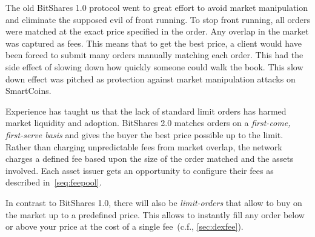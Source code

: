 The old BitShares 1.0 protocol went to great effort to avoid market
manipulation and eliminate the supposed evil of front running. To stop front
running, all orders were matched at the exact price specified in the order. Any
overlap in the market was captured as fees. This means that to get the best
price, a client would have been forced to submit many orders manually matching
each order. This had the side effect of slowing down how quickly someone could
walk the book. This slow down effect was pitched as protection against market
manipulation attacks on SmartCoins.

Experience has taught us that the lack of standard limit orders has harmed
market liquidity and adoption. BitShares 2.0 matches orders on a
\emph{first-come, first-serve basis} and gives the buyer the best price
possible up to the limit. Rather than charging unpredictable fees from market
overlap, the network charges a defined fee based upon the size of the order
matched and the assets involved. Each asset issuer gets an opportunity to
configure their fees as described in~\cref{seq:feepool}.

In contrast to BitShares 1.0, there will also be \emph{limit-orders} that allow
to buy on the market up to a predefined price. This allows to instantly fill
any order below or above your price at the cost of a single fee~(c.f.,
\cref{sec:dexfee}).
